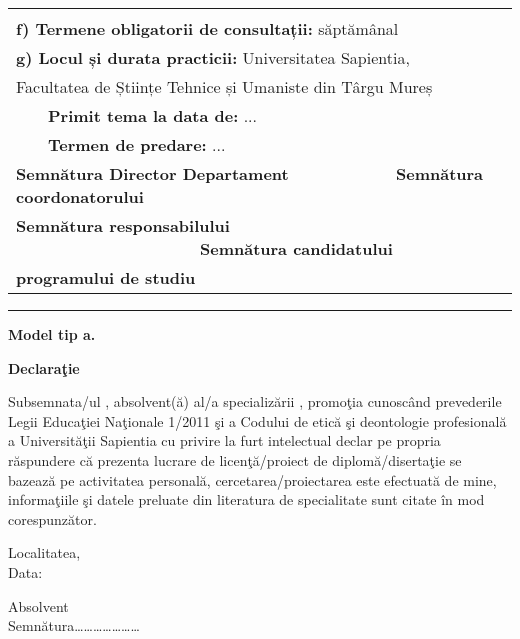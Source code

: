 \documentclass[a4paper, 11pt]{article}
\begin{document}
\begin{titlepage}
\begin{tabular}{|p{}|}
\hline \\
\textbf{f) Termene obligatorii de consultații:} săptămânal\\[5pt]
\textbf{g) Locul și durata practicii:} Universitatea Sapientia,\\
Facultatea de Științe Tehnice și Umaniste din Târgu Mureș\\[5pt]
\ \ \ \ \textbf{Primit tema la data de:} ...\\
\ \ \ \ \textbf{Termen de predare:} ...\\[3ex]
\textbf{Semnătura Director Departament \ \ \ \ \ \ \ \ \ \ \ Semnătura coordonatorului}\\[5ex]
\textbf{Semnătura responsabilului \ \ \ \ \ \ \ \ \ \ \ \ \ \ \ \ \ \ \ \ Semnătura candidatului}\\
\textbf{programului de studiu}\\[2ex]
\hline
\end{tabular}
\end{titlepage}

\begin{titlepage}
\hyphenchar{}
\sloppy

\noindent \rule[10pt]{\textwidth}{1pt}
\begin{flushright}
{\fontsize{12pt}{1} \textbf{Model tip a.}}
\end{flushright}

\vspace{7em}
\begin{center}
{\fontsize{12pt}{1} \textbf{Declaraţie}}\\
\end{center}

\vspace{4em}
\doublespacing
\large Subsemnata/ul , absolvent(ă) al/a specializării , promoţia  cunoscând prevederile Legii Educaţiei Naţionale 1/2011 şi a Codului de etică şi deontologie profesională a Universităţii Sapientia cu privire la furt intelectual declar pe propria răspundere că prezenta lucrare de licenţă/proiect de diplomă/disertaţie se bazează pe activitatea personală, cercetarea/proiectarea este efectuată de mine, informaţiile şi datele preluate din literatura de specialitate sunt citate în mod corespunzător.

\vspace{15em}
\begin{flushleft}
{\large Localitatea,\\
Data:}
\end{flushleft}

\begin{flushright}
{\large Absolvent\\
Semnătura…………………}
\end{flushright}

\end{titlepage}
\end{document}
